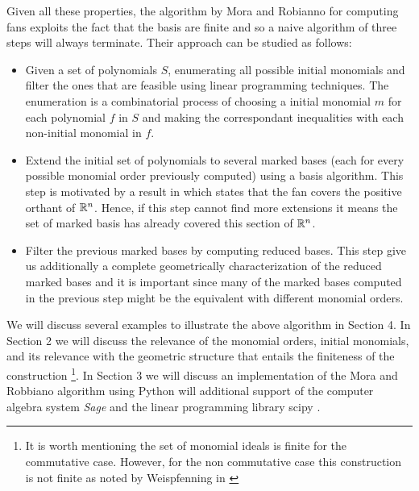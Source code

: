 Given all these properties, the algorithm by Mora and Robianno \cite{MORA1988183}
for computing \grob fans exploits the fact that the \grob basis are finite and so
a naive algorithm of three steps will always terminate. Their approach can be
studied as follows:

\begin{itemize}
\item[1.] Given a set of polynomials $S$, enumerating all possible initial monomials
  and filter the ones that are feasible using linear programming techniques.
  The enumeration is a combinatorial
  process of choosing a initial monomial $m$ for each polynomial $f$ in $S$ and making the
  correspondant inequalities with each non-initial monomial in $f$. 
\item[2.] Extend the initial set of polynomials to several marked \grob bases
  (each for every possible monomial order previously computed)
  using a \grob basis algorithm. This step is motivated by a result in
  \cite{Cox:2014} which states that the \grob fan covers the positive orthant
  of $\mathbb{R}^n$. Hence, if this step cannot find more extensions it means
  the set of marked \grob basis has already covered this section of $\mathbb{R}^n$.
\item[3.] Filter the previous marked \grob bases by computing reduced \grob
  bases. This step give us additionally a complete geometrically characterization
  of the reduced marked \grob bases and it is important since many of the marked
  \grob bases computed in the previous step might be the equivalent with different
  monomial orders. 
\end{itemize}

We will discuss several examples to illustrate the above algorithm in Section 4. In Section
2 we will discuss the relevance of the monomial orders, initial monomials, and its relevance
with the geometric structure that entails the finiteness of the construction \footnote{It is worth
  mentioning the set of monomial ideals is finite for the commutative case. However, for the non
  commutative case this construction is not finite as noted by Weispfenning in
  \cite{10.1007/3-540-51082-6_96}}. In Section 3 we will discuss an implementation of the
Mora and Robbiano algorithm using Python will additional support of the computer algebra system \emph{Sage}
\cite{SageMultivariatePolynomials} and the linear programming library scipy \cite{linprog}.


